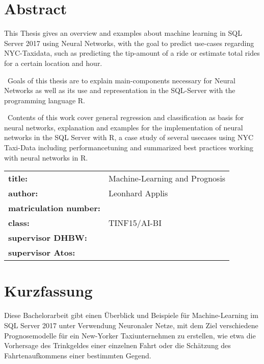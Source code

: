 \chapter*{Abstract} %
This Thesis gives an overview and examples about machine learning in SQL Server 2017 using Neural Networks, with the goal to predict use-cases regarding NYC-Taxidata, such as predicting the tip-amount of a ride or estimate total rides for a certain location and hour.  

~\newline Goals of this thesis are to explain main-components necessary for Neural Networks as well as its use and representation in the SQL-Server with the programming language R. 

~\newline Contents of this work cover general regression and classification as basis for neural networks, explanation and examples for the implementation of neural networks in the SQL Server with R, a case study of several usecases using NYC Taxi-Data including performancetuning and summarized best practices working with neural networks in R. 
~\newline
~\newline
\begin{flushleft}
	\begin{tabular}{ll}
		\textbf{title:} &\quad Machine-Learning and Prognosis \\
		\textbf{author:}  &\quad Leonhard Applis \\
		\textbf{matriculation number:} &\quad 2086307 \\
		\textbf{class:} &\quad TINF15/AI-BI \\
		\textbf{supervisor DHBW:} &\quad \betreuerdhbw \\
		\textbf{supervisor Atos:} & \quad \betreuerfirma \\
		[6ex]%
	\end{tabular} 
\end{flushleft}


\chapter*{Kurzfassung} 
Diese Bachelorarbeit gibt einen Überblick und Beispiele für Machine-Learning im SQL Server 2017 unter Verwendung Neuronaler Netze, mit dem Ziel verschiedene Prognosemodelle für ein New-Yorker Taxiunternehmen zu erstellen, wie etwa die Vorhersage des Trinkgeldes einer einzelnen Fahrt oder die Schätzung des Fahrtenaufkommens einer bestimmten Gegend. 


